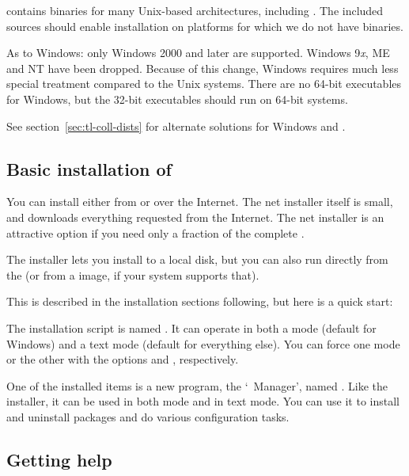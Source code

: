 \documentclass{article}
\begin{document}
\TL{} contains binaries for many Unix-based architectures,
including \MacOSX.  The included sources should enable installation
on platforms for which we do not have binaries.

As to Windows: only Windows 2000 and later are supported. Windows
9\textit{x}, ME and NT have been dropped. Because of this
change, Windows requires much less special treatment compared to
the Unix systems. There are no 64-bit executables for Windows, but the
32-bit executables should run on 64-bit systems.

See section~\ref{sec:tl-coll-dists} for alternate solutions
for Windows and \MacOSX.

\subsection{Basic installation of \protect\TL{}}
\label{sec:basic}

You can install \TL{} either from \DVD{} or over the Internet. The net
installer itself is small, and downloads everything requested from the
Internet. The net installer is an attractive option if you need only a
fraction of the complete \TL.

The \DVD{} installer lets you install to a local disk, but you can
also run \TL{} directly from the \DVD{} (or from a \DVD{} image, if
your system supports that).

\noindent This is described in the
installation sections following, but here is a quick start:

\begin{itemize*}

\item The installation script is named .  It can
  operate in both a \GUI{} mode (default for Windows) and
  a text mode (default for everything else).  You can force one mode or
  the other with the options  and , respectively.

\item One of the installed items is a new program, the `\TL\ Manager',
  named .  Like the installer, it can be used in both \GUI{}
  mode and in text mode. You can use it to install and uninstall
  packages and do various configuration tasks.

\end{itemize*}


\subsection{Getting help}
\label{sec:help}
\end{document}
